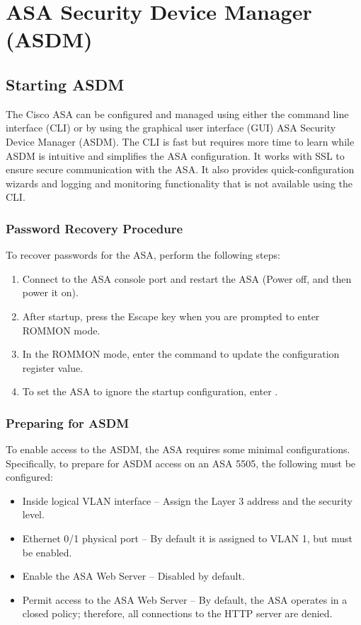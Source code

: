 \chapter{ASA Security Device Manager (ASDM)}

\section{Starting ASDM}

The Cisco ASA can be configured and managed using either the command line interface (CLI) or by using the graphical user interface (GUI) ASA Security Device Manager (ASDM). The CLI is fast but requires more time to learn while ASDM is intuitive and simplifies the ASA configuration. It works with SSL to ensure secure communication with the ASA. It also provides quick-configuration wizards and logging and monitoring functionality that is not available using the CLI.

\subsection{Password Recovery Procedure}

To recover passwords for the ASA, perform the following steps:

\begin{enumerate}
\item Connect to the ASA console port and restart the ASA (Power off, and then power it on).
\item After startup, press the Escape key when you are prompted to enter ROMMON mode.
\item In the ROMMON mode, enter the  command to update the configuration register value.
\item To set the ASA to ignore the startup configuration, enter .
\end{enumerate}

\subsection{Preparing for ASDM}

To enable access to the ASDM, the ASA requires some minimal configurations. Specifically, to prepare for ASDM access on an ASA 5505, the following must be configured:

\begin{itemize}
\item Inside logical VLAN interface -- Assign the Layer 3 address and the security level.
\item Ethernet 0/1 physical port -- By default it is assigned to VLAN 1, but must be enabled.
\item Enable the ASA Web Server -- Disabled by default.
\item Permit access to the ASA Web Server -- By default, the ASA operates in a closed policy; therefore, all connections to the HTTP server are denied.
\end{itemize}


